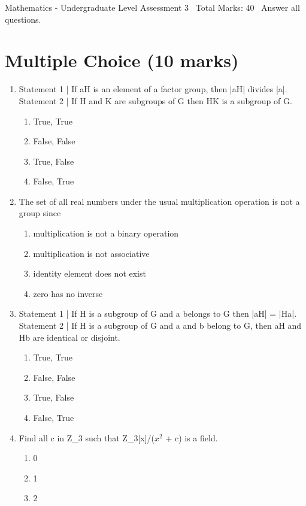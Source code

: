 \documentclass[12pt]{article}
\begin{document}
\begin{center}
Mathematics - Undergraduate Level Assessment 3 \
Total Marks: 40 \
Answer all questions.
\end{center}

\section*{Multiple Choice (10 marks)}
\begin{enumerate}[label=\arabic*.]
\item Statement 1 | If aH is an element of a factor group, then |aH| divides |a|. Statement 2 | If H and K are subgroups of G then HK is a subgroup of G.
\begin{enumerate}[label=(\alph*)]
    \item True, True
    \item False, False
    \item True, False
    \item False, True
\end{enumerate}
\item The set of all real numbers under the usual multiplication operation is not a group since
\begin{enumerate}[label=(\alph*)]
    \item multiplication is not a binary operation
    \item multiplication is not associative
    \item identity element does not exist
    \item zero has no inverse
\end{enumerate}
\item Statement 1 | If H is a subgroup of G and a belongs to G then |aH| = |Ha|. Statement 2 | If H is a subgroup of G and a and b belong to G, then aH and Hb are identical or disjoint.
\begin{enumerate}[label=(\alph*)]
    \item True, True
    \item False, False
    \item True, False
    \item False, True
\end{enumerate}
\item Find all c in Z\_3 such that Z\_3[x]/($x^2$ + c) is a field.
\begin{enumerate}[label=(\alph*)]
    \item 0
    \item 1
    \item 2

\end{enumerate}
\end{enumerate}
\end{document}
